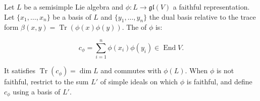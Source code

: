 Let $L$ be a semisimple Lie algebra and $\phi: L \rightarrow \mathfrak{gl}(V)$ a faithful representation. Let $\{x_1, \ldots, x_n\}$ be a basis of $L$ and $\{y_1, \ldots, y_n\}$ the dual basis relative to the trace form $\beta(x,y) = \operatorname{Tr}(\phi(x)\phi(y))$. The  of $\phi$ is:

$$c_\phi = \sum_{i=1}^{n} \phi(x_i)\phi(y_i) \in \operatorname{End} V.$$

It satisfies $\operatorname{Tr}(c_\phi) = \dim L$ and commutes with $\phi(L)$. When $\phi$ is not faithful, restrict to the sum $L'$ of simple ideals on which $\phi$ is faithful, and define $c_\phi$ using a basis of $L'$.
